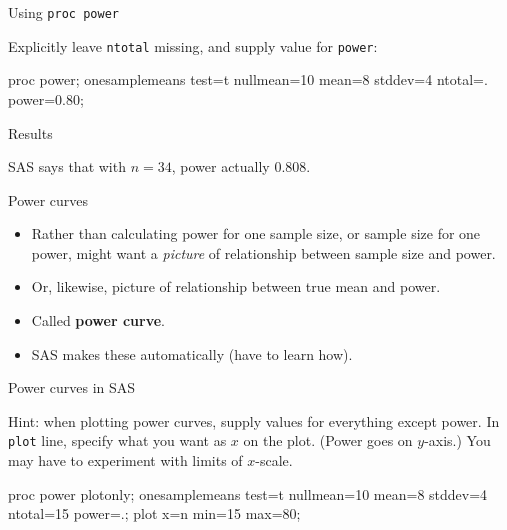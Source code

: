 \documentclass[unknownkeysallowed]{beamer}\usepackage[]{graphicx}\usepackage[]{color}
\begin{document}

\begin{frame}[fragile]{Using \texttt{proc power}}

  Explicitly leave \texttt{ntotal} missing, and supply value for
  \texttt{power}: 
  
    \begin{Sascode}[store=pc]
proc power;
  onesamplemeans
  test=t
  nullmean=10
  mean=8
  stddev=4
  ntotal=.
  power=0.80;
    \end{Sascode}

\end{frame}

\begin{frame}[fragile]{Results}
  
  
SAS says that with $n=34$, power
actually 0.808.

\end{frame}

\begin{frame}[fragile]{Power curves}
  
  \begin{itemize}
  \item Rather than calculating power for one sample size, or sample
    size for one power, might want a \emph{picture} of relationship
    between sample size and power.
  \item Or, likewise, picture of relationship between true mean and
    power.
  \item Called \textbf{power curve}.
  \item SAS makes these automatically (have to learn how).
  \end{itemize}
  
\end{frame}

\begin{frame}[fragile]{Power curves in SAS}

    
  Hint: when plotting power curves, supply values for everything
  except power. In \texttt{plot} line, specify what you want as $x$ on
  the plot. (Power goes on $y$-axis.) You may have to experiment with
  limits of $x$-scale.
  
  \begin{Sascode}[store=pd]
  proc power plotonly;
    onesamplemeans
      test=t
      nullmean=10
      mean=8
      stddev=4
      ntotal=15
      power=.;    
    plot x=n min=15 max=80;
  \end{Sascode}

\end{frame}
\end{document}
